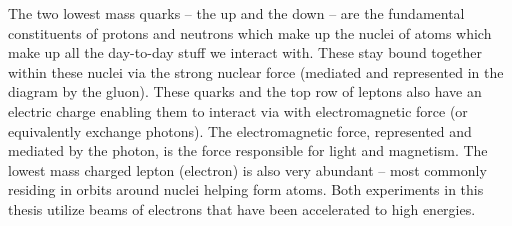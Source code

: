 The two lowest mass quarks -- the up and the down -- are the fundamental constituents of protons and neutrons which make up the nuclei of atoms which make up all the day-to-day stuff we interact with. These stay bound together within these nuclei via the strong nuclear force (mediated and represented in the diagram by the gluon). These quarks and the top row of leptons also have an electric charge enabling them to interact via with electromagnetic force (or equivalently exchange photons). The electromagnetic force, represented and mediated by the photon, is the force responsible for light and magnetism. The lowest mass charged lepton (electron) is also very abundant -- most commonly residing in orbits around nuclei helping form atoms. Both experiments in this thesis utilize beams of electrons that have been accelerated to high energies.

